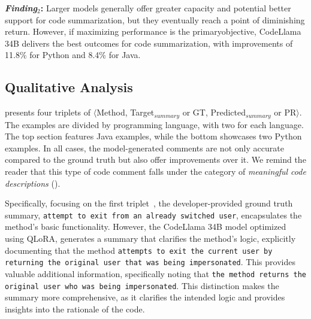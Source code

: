 \begin{boxM}
	\textbf{\emph{Finding$_{2}$}:}  Larger models generally offer greater capacity and potential better support for code summarization, but they eventually reach a point of diminishing return. However, if maximizing performance is the primaryobjective, CodeLlama 34B delivers the best outcomes
	for code summarization, with improvements of 11.8\% for Python and 8.4\% for Java.
\end{boxM}




\subsection{Qualitative Analysis}

 presents four triplets of $\langle$Method, Target$_{summary}$ or GT, Predicted$_{summary}$ or PR$\rangle$. The examples are divided by programming language, with two for each language. The top section features Java examples, while the bottom showcases two Python examples. In all cases, the model-generated comments are not only accurate compared to the ground truth but also offer improvements over it. We remind the reader that this type of code comment falls under the category of \emph{meaningful code descriptions} ().

Specifically, focusing on the first triplet~, the developer-provided ground truth summary, \texttt{attempt to exit from an already switched user}, encapsulates the method's basic functionality. However, the CodeLlama 34B model optimized  using QLoRA, generates a summary that clarifies the method’s logic, explicitly documenting that the method \texttt{attempts to exit the current user by returning the original user that was being impersonated}. This provides valuable additional information, specifically noting that \texttt{the method returns the original user who was being impersonated}. This distinction makes the summary more comprehensive, as it clarifies the intended logic and provides insights into the rationale of the code.

